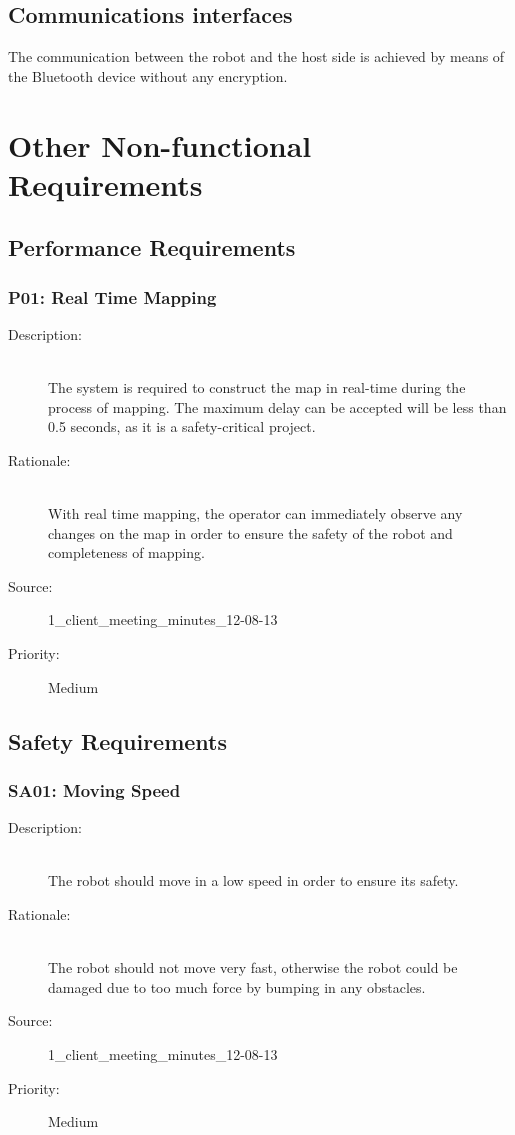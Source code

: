 \documentclass[titlepage]{article}
\begin{document}
\subsection{Communications interfaces}
The communication between the robot and the host side is achieved by means of the Bluetooth device without any encryption.

\newpage





\section{Other Non-functional Requirements}

\subsection{Performance Requirements}
\subsubsection{P01: Real Time Mapping}

\begin{description}
\item[Description: ] \hfill \\The system is required to construct the map in real-time during the process of mapping. The maximum delay can be accepted will be less than 0.5 seconds, as it is a safety-critical project.
\item[Rationale: ] \hfill \\With real time mapping, the operator can immediately observe any changes on the map in order to ensure the safety of the robot and completeness of mapping.
\item[Source: ] 1\_client\_meeting\_minutes\_12-08-13
\item[Priority: ] Medium
\end{description}


\subsection{Safety Requirements}

\subsubsection{SA01: Moving Speed}
\begin{description}
\item[Description: ] \hfill \\The robot should move in a low speed in order to ensure its safety.
\item[Rationale: ] \hfill \\The robot should not move very fast, otherwise the robot could be damaged due to too much force by bumping in any obstacles. 
\item[Source: ] 1\_client\_meeting\_minutes\_12-08-13
\item[Priority: ] Medium
\end{description}
\end{document}
